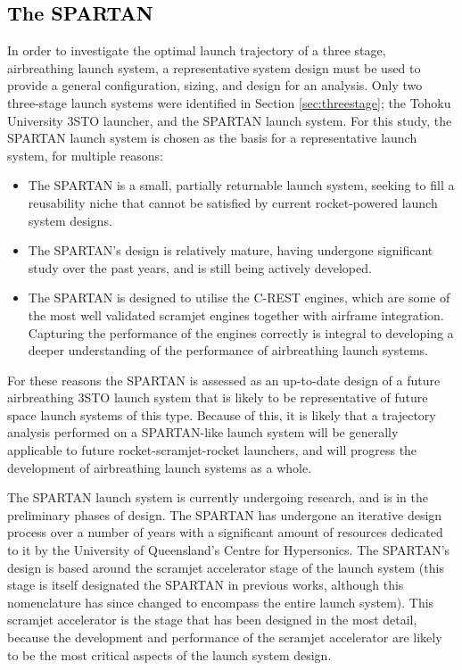 \textcolor{black}{
\section{The SPARTAN}
}

\noindent
In order to investigate the optimal launch trajectory of a three stage, airbreathing launch system, a representative system design must be used to provide a general configuration, sizing, and design for an analysis. Only two three-stage launch systems were identified in Section \ref{sec:threestage}; the Tohoku University 3STO launcher\cite{Kimura1999}, and the SPARTAN launch system\cite{Preller2017b}. For this study, the SPARTAN launch system is chosen as the basis for a representative launch system, for multiple reasons\cite{Jazra2013,Preller2017b,Hypersonix}:
\begin{itemize}
	\item The SPARTAN is a small, partially returnable launch system, seeking to fill a reusability niche that cannot be satisfied by current rocket-powered launch system designs.
	\item The SPARTAN's design is relatively mature, having undergone significant study over the past years, and is still being actively developed.
	\item The SPARTAN is designed to utilise the C-REST engines, which are some of the most well validated scramjet engines together with airframe integration. Capturing the performance of the engines correctly is integral to developing a deeper understanding of the performance of airbreathing launch systems.
\end{itemize}
For these reasons the SPARTAN is assessed as an up-to-date design of a future airbreathing 3STO launch system that is likely to be representative of future space launch systems of this type. Because of this, it is likely that a trajectory analysis performed on a SPARTAN-like launch system will be generally applicable to future rocket-scramjet-rocket launchers, and will progress the development of airbreathing launch systems as a whole. 


 The SPARTAN launch system is currently undergoing research, and is in the preliminary phases of design. The SPARTAN has undergone an iterative design process over a number of years\cite{Jazra2013,Preller2017b} with a significant amount of resources dedicated to it by the University of Queensland's Centre for Hypersonics.
 The SPARTAN's design is based around the scramjet accelerator stage of the launch system (this stage is itself designated the SPARTAN in previous works, although this nomenclature has since changed to encompass the entire launch system). This scramjet accelerator is the stage that has been designed in the most detail\cite{Jazra2013,Preller2017b}, because the development and performance of the scramjet accelerator are likely to be the most critical aspects of the launch system design. 
 
